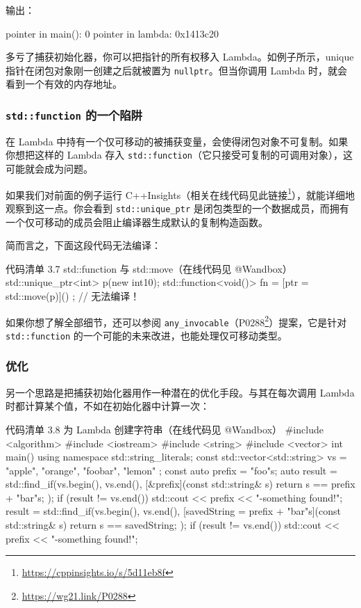 输出：

\begin{codebox}
pointer in main(): 0
pointer in lambda: 0x1413c20
\end{codebox}

多亏了捕获初始化器，你可以把指针的所有权移入 Lambda。如例子所示，unique 指针在闭包对象刚一创建之后就被置为 \texttt{nullptr}。但当你调用 Lambda 时，就会看到一个有效的内存地址。

\subsubsection{\texttt{std::function} 的一个陷阱}

在 Lambda 中持有一个仅可移动的被捕获变量，会使得闭包对象不可复制。如果你想把这样的 Lambda 存入 \texttt{std::function}（它只接受可复制的可调用对象），这可能就会成为问题。

如果我们对前面的例子运行 C++Insights（相关在线代码见此链接\footnote{\url{https://cppinsights.io/s/5d11eb8f}}），就能详细地观察到这一点。你会看到 \texttt{std::unique\_ptr} 是闭包类型的一个数据成员，而拥有一个仅可移动的成员会阻止编译器生成默认的复制构造函数。

简而言之，下面这段代码无法编译：

\begin{codeboxt}{代码清单 3.7 std::function 与 std::move（在线代码见 @Wandbox）}
std::unique_ptr<int> p(new int{10});
std::function<void()> fn = [ptr = std::move(p)]() { }; // 无法编译！
\end{codeboxt}


如果你想了解全部细节，还可以参阅 \texttt{any\_invocable}（P0288\footnote{\url{https://wg21.link/P0288}}）提案，它是针对 \texttt{std::function} 的一个可能的未来改进，也能处理仅可移动类型。

\subsubsection{优化}

另一个思路是把捕获初始化器用作一种潜在的优化手段。与其在每次调用 Lambda 时都计算某个值，不如在初始化器中计算一次：

\begin{codeboxt}{代码清单 3.8 为 Lambda 创建字符串（在线代码见 @Wandbox）}
#include <algorithm>
#include <iostream>
#include <string>
#include <vector>
int main() {
using namespace std::string_literals;
const std::vector<std::string> vs = { "apple", "orange",
"foobar", "lemon" };
const auto prefix = "foo"s;
auto result = std::find_if(vs.begin(), vs.end(),
[&prefix](const std::string& s) {
return s == prefix + "bar"s;
}
);
if (result != vs.end())
std::cout << prefix << "-something found!\n";
result = std::find_if(vs.begin(), vs.end(),
[savedString = prefix + "bar"s](const std::string& s) {
return s == savedString;
}
);
if (result != vs.end())
std::cout << prefix << "-something found!\n";
}
\end{codeboxt}

